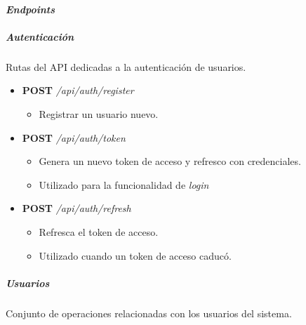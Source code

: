 \documentclass[12pt,a4paper,]{scrartcl}
\providecommand{\tightlist}{%
  \setlength{\itemsep}{0pt}\setlength{\parskip}{0pt}}
\let\oldparagraph\paragraph
\renewcommand{\paragraph}[1]{\oldparagraph{#1}\mbox{}}
\let\oldsubparagraph\subparagraph
\renewcommand{\subparagraph}[1]{\oldsubparagraph{#1}\mbox{}}
\begin{document}
\hypertarget{endpoints}{%
\paragraph{\texorpdfstring{\emph{Endpoints}}{Endpoints}}\label{endpoints}}

\hypertarget{autenticaciuxf3n}{%
\subparagraph{Autenticación}\label{autenticaciuxf3n}}

Rutas del API dedicadas a la autenticación de usuarios.

\begin{itemize}
\tightlist
\item
  \textbf{POST} \emph{/api/auth/register}

  \begin{itemize}
  \tightlist
  \item
    Registrar un usuario nuevo.
  \end{itemize}
\item
  \textbf{POST} \emph{/api/auth/token}

  \begin{itemize}
  \tightlist
  \item
    Genera un nuevo token de acceso y refresco con credenciales.
  \item
    Utilizado para la funcionalidad de \emph{login}
  \end{itemize}
\item
  \textbf{POST} \emph{/api/auth/refresh}

  \begin{itemize}
  \tightlist
  \item
    Refresca el token de acceso.
  \item
    Utilizado cuando un token de acceso caducó.
  \end{itemize}
\end{itemize}

\hypertarget{usuarios}{%
\subparagraph{Usuarios}\label{usuarios}}

Conjunto de operaciones relacionadas con los usuarios del sistema.
\end{document}
